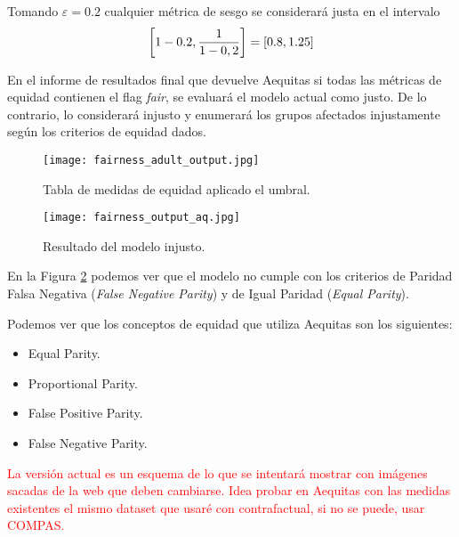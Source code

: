 Tomando $\varepsilon=0.2$ cualquier métrica de sesgo se considerará justa en el intervalo $$\left[1-0.2,\frac{\displaystyle 1}{\displaystyle 1-0,2}\right]=[0.8,1.25]$$

En el informe de resultados final que devuelve Aequitas si todas las métricas de equidad contienen el flag \textit{fair}, se evaluará el modelo actual como justo. De lo contrario, lo considerará injusto y enumerará los grupos afectados injustamente según los criterios de equidad dados.

\begin{figure}[h]
	\centering
	\texttt{[image: fairness\_adult\_output.jpg]}
	\caption{Tabla de medidas de equidad aplicado el umbral.}
    \label{fig:medequmbral}
\end{figure}

\begin{figure}[h]
	\centering
	\texttt{[image: fairness\_output\_aq.jpg]}
	\caption{Resultado del modelo injusto.}
    \label{fig:ejunfairaq}
\end{figure}

En la Figura \ref{fig:ejunfairaq} podemos ver que el modelo no cumple con los criterios de Paridad Falsa Negativa (\textit{False Negative Parity}) y de Igual Paridad (\textit{Equal Parity}).

Podemos ver que los conceptos de equidad que utiliza Aequitas son los siguientes:

\begin{itemize}
    \item Equal Parity.
    \item Proportional Parity.
    \item False Positive Parity.
    \item False Negative Parity.
\end{itemize}

\textcolor{red}{La versión actual es un esquema de lo que se intentará mostrar con imágenes sacadas de la web que deben cambiarse. Idea probar en Aequitas con las medidas existentes el mismo dataset que usaré con contrafactual, si no se puede, usar COMPAS.}